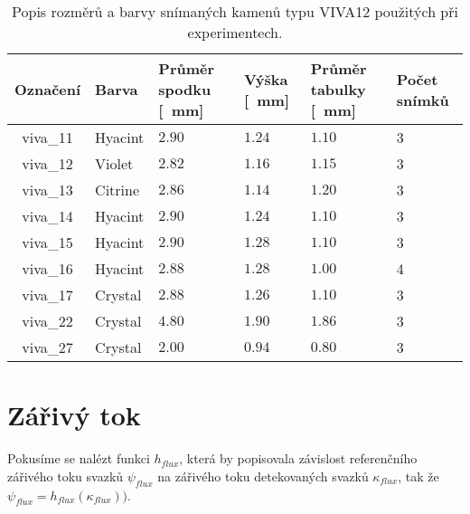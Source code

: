 \begin{table}[htps]
\centering
	\begin{tabular}{c|C{2cm}|C{2.2cm}|C{2cm}|C{2.3cm}|C{2cm}}
	Označení & Barva 	& Průměr spodku [\SI{}{\milli\metre}] 	& Výška [\SI{}{\milli\metre}]  & Průměr tabulky [\SI{}{\milli\metre}] & Počet snímků\\ \hline \hline
	viva\_11 & Hyacint	&	$2.90$			& $1.24$    &	$1.10$			&	3\\ \hline
	viva\_12 & Violet	&	$2.82$			& $1.16$	&	$1.15$			&	3\\ \hline
	viva\_13 & Citrine  &	$2.86$			& $1.14$	&	$1.20$			&	3\\ \hline
	viva\_14 & Hyacint	&	$2.90$			& $1.24$	&	$1.10$			&	3\\ \hline
	viva\_15 & Hyacint	&	$2.90$			& $1.28$	&	$1.10$			&	3\\ \hline
	viva\_16 & Hyacint	&	$2.88$			& $1.28$	&	$1.00$			&	4\\ \hline
	viva\_17 & Crystal	&	$2.88$			& $1.26$	&	$1.10$			&	3\\ \hline
	viva\_22 & Crystal	&	$4.80$			& $1.90$	&	$1.86$			&	3\\ \hline
	viva\_27 & Crystal	&	$2.00$			& $0.94$	&	$0.80$			&	3\\ 
	\end{tabular}
	\caption{Popis rozměrů a barvy snímaných kamenů typu VIVA12 použitých při experimentech.}
	\label{tab:viva12desc}
\end{table}

\section*{Zářivý tok}
Pokusíme se nalézt funkci $h_{flux}$, která by popisovala závislost referenčního zářivého toku svazků $\psi_{flux}$ na zářivého toku detekovaných svazků $\kappa_{flux}$, tak že $\psi_{flux} = h_{flux}\left( \kappa_{flux} \right))$. 

